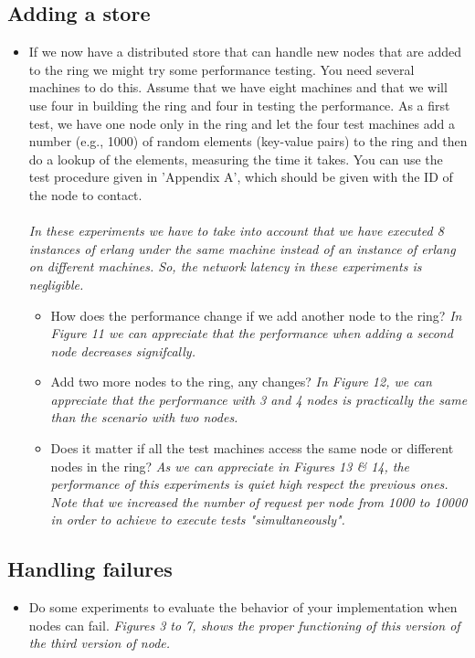 \subsection{Adding a store}
\begin{itemize}
\item If we now have a distributed store that can handle new nodes that are added to the ring we might try some performance testing. You need several machines to do this. Assume that we have eight machines and that we will use four in building the ring and four in testing the performance.
As a first test, we have one node only in the ring and let the four test machines add a number (e.g., 1000) of random elements (key-value pairs)
to the ring and then do a lookup of the elements, measuring the time it takes. You can use the test procedure given in 'Appendix A', which should be given with the ID of the node to contact.\\\\
\textit{In these experiments we have to take into account that we have executed 8 instances of erlang under the same machine instead of an instance of erlang on different machines. So, the network latency in these experiments is negligible.}
\begin{itemize}
\item How does the performance change if we add another node to the ring?
\newline \textit{In Figure 11 we can appreciate that the performance when adding a second node decreases signifcally.}

\item Add two more nodes to the ring, any changes?
\newline \textit{In Figure 12, we can appreciate that the performance with 3 and 4 nodes is practically the same than the scenario with two nodes.}

\item Does it matter if all the test machines access the same node or different nodes in the ring?
\newline \textit{As we can appreciate in Figures 13 & 14, the performance of this experiments is quiet high respect the previous ones. Note that we increased the number of request per node from 1000 to 10000 in order to achieve to execute tests "simultaneously".}
\end{itemize}
\end{itemize}

\subsection{Handling failures}
\begin{itemize}
\item Do some experiments to evaluate the behavior of your implementation when nodes can fail.
\newline \textit{Figures 3 to 7, shows the proper functioning of this version of the third version of node.}
\end{itemize}

